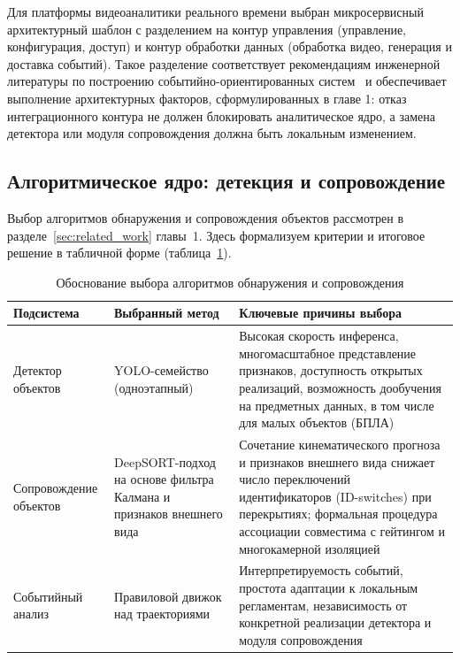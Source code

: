 Для платформы видеоаналитики реального времени выбран микросервисный архитектурный шаблон с разделением на контур управления (управление, конфигурация, доступ) и контур обработки данных (обработка видео, генерация и доставка событий). Такое разделение соответствует рекомендациям инженерной литературы по построению событийно-ориентированных систем~\cite{richardson_microservices,transactional_outbox} и обеспечивает выполнение архитектурных факторов, сформулированных в главе 1: отказ интеграционного контура не должен блокировать аналитическое ядро, а замена детектора или модуля сопровождения должна быть локальным изменением.

\subsection{Алгоритмическое ядро: детекция и сопровождение}

Выбор алгоритмов обнаружения и сопровождения объектов рассмотрен в разделе~\ref{sec:related_work} главы~1. Здесь формализуем критерии и итоговое решение в табличной форме (таблица~\ref{tab:algo_choice}).

\begin{table}[H]
\caption{Обоснование выбора алгоритмов обнаружения и сопровождения}
\label{tab:algo_choice}
\begin{tabularx}{\textwidth}{@{}>{\raggedright\arraybackslash}p{} >{\raggedright\arraybackslash}p{} X@{}}
\toprule
Подсистема & Выбранный метод & Ключевые причины выбора \\
\midrule
Детектор объектов & YOLO-семейство (одноэтапный)~\cite{redmon2016yolo,redmon2018yolov3,ultralytics_docs} & Высокая скорость инференса, многомасштабное представление признаков, доступность открытых реализаций, возможность дообучения на предметных данных, в том числе для малых объектов (БПЛА) \\
Сопровождение объектов & DeepSORT-подход на основе фильтра Калмана и признаков внешнего вида~\cite{wojke2017deepsort,kalman1960,kuhn1955hungarian} & Сочетание кинематического прогноза и признаков внешнего вида снижает число переключений идентификаторов (ID-switches) при перекрытиях; формальная процедура ассоциации совместима с гейтингом и многокамерной изоляцией \\
Событийный анализ & Правиловой движок над траекториями~\cite{transactional_outbox} & Интерпретируемость событий, простота адаптации к локальным регламентам, независимость от конкретной реализации детектора и модуля сопровождения \\
\bottomrule
\end{tabularx}
\end{table}

